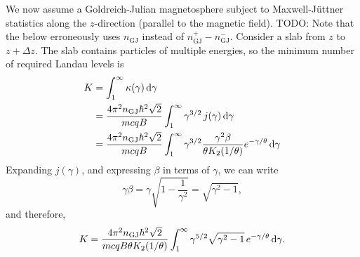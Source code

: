 \documentclass{book}
\newcommand{\todo}[1]{{\color{red}TODO: {#1}}}
\newcommand{\nGJ}{n_{\rm GJ}}
\begin{document}
We now assume a Goldreich-Julian magnetosphere subject to Maxwell-J\"uttner statistics along the $z$-direction (parallel to the magnetic field).
\todo{Note that the below erroneously uses $n_\text{GJ}$ instead of $n_\text{GJ}^+ - n_\text{GJ}^-$.}
Consider a slab from $z$ to $z + \Delta z$.
The slab contains particles of multiple energies, so the minimum number of required Landau levels is
\begin{equation}
  \begin{aligned}
    K &= \int_1^\infty \kappa(\gamma)\,{\rm d}\gamma \\
      &= \frac{4\pi^2 \nGJ \hbar^2 \sqrt{2}}{mcqB} \int_1^\infty \gamma^{3/2}\,j(\gamma)\,{\rm d}\gamma \\
      &= \frac{4\pi^2 \nGJ \hbar^2 \sqrt{2}}{mcqB} \int_1^\infty \gamma^{3/2} \frac{\gamma^2\beta}{\theta K_2(1/\theta)} e^{-\gamma/\theta}\,{\rm d}\gamma
  \end{aligned}
\end{equation}
Expanding $j(\gamma)$, and expressing $\beta$ in terms of $\gamma$, we can write
\begin{equation}
  \gamma\beta = \gamma\sqrt{1 - \frac{1}{\gamma^2}} = \sqrt{\gamma^2 - 1},
\end{equation}
and therefore,
\begin{equation}
  K = \frac{4\pi^2 \nGJ \hbar^2 \sqrt{2}}{mcqB \theta K_2(1/\theta)} \int_1^\infty \gamma^{5/2}\sqrt{\gamma^2 - 1} \, e^{-\gamma/\theta} \, {\rm d}\gamma.
\end{equation}
\end{document}

